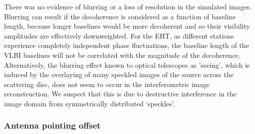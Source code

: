 There was no evidence of blurring or a loss of resolution in the simulated images. Blurring can result if the decoherence is considered as a function of baseline length, because longer baselines would be more decoherent and so their visibility amplitudes are effectively downweighted. For the EHT, as different stations experience completely independent phase fluctuations, the baseline length of the VLBI baselines will not be correlated with the magnitude of the decoherence. Alternatively, the blurring effect known to optical telescopes as 'seeing', which is induced by the overlaying of many speckled images of the source \citep{Narayan_1992} across the scattering disc, does not seem to occur in the interferometric image reconstruction. We suspect that this is due to destructive interference in the image domain from symmetrically distributed `speckles'.




\subsubsection{Antenna pointing offset}




